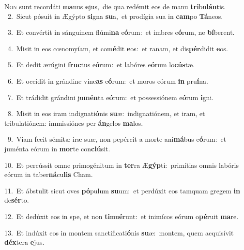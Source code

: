 \lettrine{\initial\textcolor{\initialcolor}{N}}{on} sunt recordáti \textbf{ma}\-nus \textbf{e}\-jus,~\star die qua redémit eos de manu \textbf{tri}\-bu\-\textbf{lán}\-tis.\\
{\numbfont\textcolor{\numbcolor}{~2.}}~Sicut pósuit in Ægýpto \textbf{si}\-gna \textbf{su}\-a,~\star et prodígia sua in \textbf{cam}\-po \textbf{Tá}\-neos.\par
{\numbfont\textcolor{\numbcolor}{~3.}}~Et convértit in sánguinem flúmi\textbf{na} e\-\textbf{ó}\-rum:~\star et imbres e\-\textbf{ó}\-rum, ne \textbf{bí}\-berent.\par
{\numbfont\textcolor{\numbcolor}{~4.}}~Misit in eos cœnomyíam, et com\-\textbf{é}\-dit \textbf{e}\-os:~\star et ranam, et dis\-\textbf{pér}\-didit \textbf{e}\-os.\par
{\numbfont\textcolor{\numbcolor}{~5.}}~Et dedit ærúgini \textbf{fruc}\-tus e\-\textbf{ó}\-rum:~\star et labóres e\-\textbf{ó}\-rum lo\-\textbf{cús}\-tæ.\par
{\numbfont\textcolor{\numbcolor}{~6.}}~Et occídit in grándine víne\textbf{as} e\-\textbf{ó}\-rum:~\star et moros eórum \textbf{in} pru\-\textbf{í}\-na.\par
{\numbfont\textcolor{\numbcolor}{~7.}}~Et trádidit grándini ju\-\textbf{mén}\-ta e\-\textbf{ó}\-rum:~\star et possessiónem e\-\textbf{ó}\-rum \textbf{i}\-gni.\par
{\numbfont\textcolor{\numbcolor}{~8.}}~Misit in eos iram indignati\-\textbf{ó}\-nis \textbf{su}\-æ:~\star indignatiónem, et iram, et tribulatiónem: immissiónes per \textbf{án}\-gelos \textbf{ma}\-los.\par
{\numbfont\textcolor{\numbcolor}{~9.}}~Viam fecit sémitæ iræ suæ, non pepércit a morte ani\-\textbf{má}\-bus e\-\textbf{ó}\-rum:~\star et juménta eórum in \textbf{mor}\-te con\-\textbf{clú}\-sit.\par
{\numbfont\textcolor{\numbcolor}{10.}}~Et percússit omne primogénitum in \textbf{ter}\-ra Æ\-\textbf{gýp}\-ti:~\star primítias omnis labóris eórum in taber\-\textbf{ná}\-cu\textbf{lis} Cham.\par
{\numbfont\textcolor{\numbcolor}{11.}}~Et ábstulit sicut oves \textbf{pó}\-pulum \textbf{su}\-um:~\star et perdúxit eos tamquam gregem \textbf{in} de\-\textbf{sér}\-to.\par
{\numbfont\textcolor{\numbcolor}{12.}}~Et dedúxit eos in spe, et non \textbf{ti}\-mu\-\textbf{é}\-runt:~\star et inimícos eórum o\-\textbf{pé}\-ruit \textbf{ma}\-re.\par
{\numbfont\textcolor{\numbcolor}{13.}}~Et indúxit eos in montem sanctificati\-\textbf{ó}\-nis \textbf{su}\-æ:~\star montem, quem acquisívit \textbf{déx}\-tera \textbf{e}\-jus.\par
